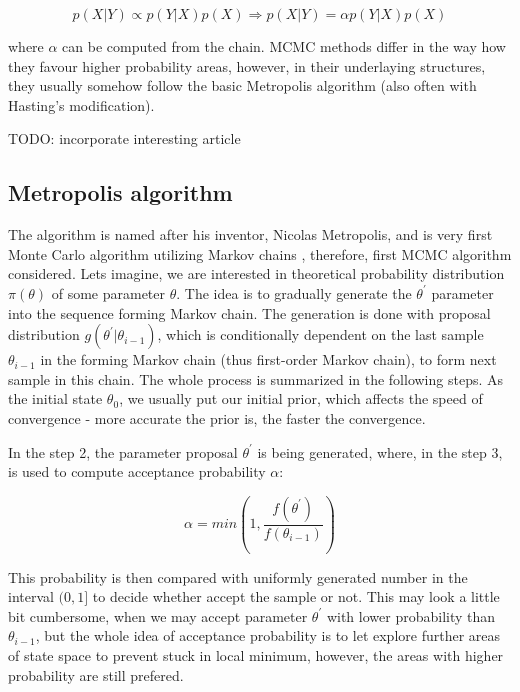 \documentclass[
  digital, %
  oneside, %
  lof,     %
  lot,     %
]{fithesis4}
\begin{document}
\begin{equation}
p( X | Y ) \propto p( Y | X ) p(X) \Rightarrow p( X | Y ) = \alpha p( Y | X ) p(X)
\end{equation}

where $\alpha$ can be computed from the chain. 
MCMC methods differ in the way how they favour 
higher probability areas, however, in their 
underlaying structures, they usually somehow 
follow the basic Metropolis algorithm (also 
often with Hasting's modification).

TODO: incorporate interesting \cite{beichl2000} article

\subsection{Metropolis algorithm}

The algorithm is named after his inventor, 
Nicolas Metropolis, and is very first Monte 
Carlo algorithm utilizing Markov chains 
\cite{metropolis1953}, therefore, first 
MCMC algorithm considered.
Lets imagine, we are interested in theoretical 
probability distribution $\pi(\theta)$ of 
some parameter $\theta$. 
The idea is to gradually generate the 
$\theta^\prime$ parameter into the sequence 
forming Markov chain. 
The generation is done with proposal distribution 
$g(\theta^\prime | \theta_{i-1})$, which is 
conditionally dependent on the last sample 
$\theta_{i-1}$ in the forming Markov chain 
(thus first-order Markov chain), to form 
next sample in this chain. 
The whole process is summarized in the 
following steps. As the initial state 
$\theta_0$, we usually put our initial prior, 
which affects the speed of convergence - 
more accurate the prior is, the faster the 
convergence.

In the step 2, the parameter proposal $\theta^\prime$ 
is being generated, where, in the step 3, is used 
to compute acceptance probability $\alpha$:

\begin{equation}\label{eq:metropolis-alpha}
  \alpha = min\left(1, \frac{f(\theta^\prime)}{f(\theta_{i-1})}\right)
\end{equation}

This probability is then compared with uniformly generated number in
the interval $(0, 1]$ to decide whether accept the 
sample or not. This may look a little bit cumbersome, 
when we may accept parameter $\theta^\prime$ with 
lower probability than $\theta_{i-1}$, but the 
whole idea of acceptance probability is to let 
explore further areas of state space to prevent 
stuck in local minimum, however, the areas with 
higher probability are still prefered.
\end{document}
